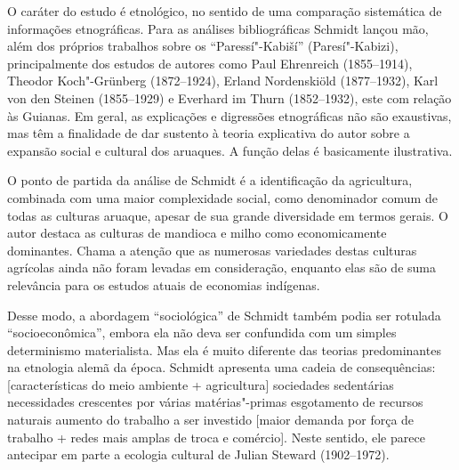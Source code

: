 O caráter do estudo é etnológico, no sentido de uma comparação
sistemática de informações etnográficas. Para as análises
bibliográficas Schmidt lançou mão, além dos próprios trabalhos sobre os
``Paressí"-Kabiší'' (Paresí"-Kabizi), principalmente dos estudos de
autores como Paul Ehrenreich (1855--1914), Theodor Koch"-Grünberg
(1872--1924), Erland Nordenskiöld (1877--1932), Karl von den Steinen
(1855--1929) e Everhard im Thurn (1852--1932), este com relação às
Guianas. Em geral, as explicações e digressões etnográficas não são
exaustivas, mas têm a finalidade de dar sustento à teoria explicativa do
autor sobre a expansão social e cultural dos aruaques. A função delas é
basicamente ilustrativa.

O ponto de partida da análise de Schmidt é a identificação da
agricultura, combinada com uma maior complexidade social, como
denominador comum de todas as culturas aruaque, apesar de sua grande
diversidade em termos gerais. O autor destaca as culturas de mandioca e
milho como economicamente dominantes. Chama a atenção que as numerosas
variedades destas culturas agrícolas ainda não foram levadas em
consideração, enquanto elas são de suma relevância para os estudos
atuais de economias indígenas.

Desse modo, a abordagem ``sociológica'' de Schmidt também podia ser
rotulada ``socioeconômica'', embora ela não deva ser confundida com um
simples determinismo materialista. Mas ela é muito diferente das teorias
predominantes na etnologia alemã da época. Schmidt apresenta uma cadeia
de consequências: {[}características do meio ambiente + agricultura{]} \rightarrow{}
sociedades sedentárias \rightarrow{} necessidades crescentes por várias
matérias"-primas \rightarrow{} esgotamento de recursos naturais \rightarrow{} aumento do trabalho a
ser investido \rightarrow{} {[}maior demanda por força de trabalho + redes mais amplas
de troca e comércio{]}. Neste sentido, ele parece antecipar em parte a
ecologia cultural de Julian Steward (1902--1972).

